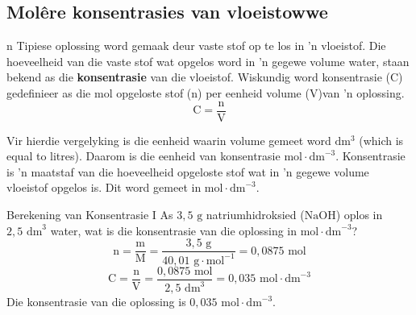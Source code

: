             \subsection*{Mol\^{e}re konsentrasies van vloeistowwe}
            \nopagebreak
n Tipiese oplossing word gemaak deur vaste stof op te los in 'n vloeistof. Die hoeveelheid van die vaste stof wat opgelos word in  'n gegewe volume water, staan bekend as die \textbf{konsentrasie} van die vloeistof. Wiskundig word konsentrasie (C) gedefinieer as die mol opgeloste stof (n) per eenheid volume (V)van  'n oplossing.\\
      \label{m38712*id282860}\nopagebreak\noindent{}      
    \begin{equation*}
    \text{C}=\frac{\text{n}}{\text{V}}
      \end{equation*}
	\begin{figure}[H] %
\begin{center}
\end{center}
 \end{figure}
Vir hierdie vergelyking is die eenheid waarin volume gemeet word $\text{dm}{}^{3}$ (which is equal to litres). Daarom is die eenheid van  konsentrasie  $\text{mol} \cdot {\text{dm}}^{-3}$. 
\label{m38712*fhsst!!!underscore!!!id1650}
 {Konsentrasie is 'n maatstaf van die hoeveelheid opgeloste stof wat in 'n gegewe volume vloeistof opgelos is. Dit word gemeet in $\text{mol} \cdot {\text{dm}}^{-3}$.} 
 
      \noindent
      \begin{wex}{Berekening van Konsentrasie I}
{
      \label{m38712*probfhsst!!!underscore!!!id1654}
      \label{m38712*id283003}As $3,5\text{ g}$ natriumhidroksied ($\text{NaOH}$) oplos in $2,5 {\text{ dm}}^{3}$ water, wat is die konsentrasie van die oplossing in $\text{mol}\ensuremath{\cdot}{\text{dm}}^{-3}$? }
{
      \label{m38712*id283067}\nopagebreak\noindent{}
    \begin{equation*}
    \text{n}=\frac{\text{m}}{\text{M}}=\frac{3,5 \text{ g}}{40,01 \text{ g} \cdot \text{mol}^{-1}} = 0,0875 \text{ mol}
      \end{equation*}
\begin{equation*}
\text{C}=\frac{\text{n}}{\text{V}}=\frac{0,0875 \text{ mol}}{2,5 \text{ dm}^{3} }=0,035 \text{ mol} \cdot \text{dm}^{-3}
\end{equation*}
Die konsentrasie van die oplossing is $0,035 \text{ mol} \cdot {\text{dm}}^{-3}$.
}
    \end{wex}

